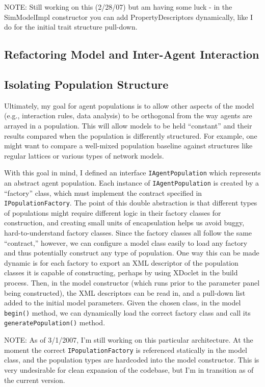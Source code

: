 \documentclass{kluwer-mem-copyright}
\begin{document}
\begin{article}
NOTE:  Still working on this (2/28/07) but am having some luck - in the
SimModelImpl constructor you can add PropertyDescriptors dynamically, like I do
for the initial trait structure pull-down.

\subsection{Refactoring Model and Inter-Agent Interaction}

\subsection{Isolating Population Structure}
Ultimately, my goal for agent populations is to allow other aspects of the model
(e.g., interaction rules, data analysis) to be orthogonal from the way agents
are arrayed in a population.  This will allow models to be held ``constant'' and
their results compared when the population is differently structured.  For
example, one might want to compare a well-mixed population baseline against
structures like regular lattices or various types of network models.  

With this goal in mind, I defined an interface \texttt{IAgentPopulation} which
represents an abstract agent population.  Each instance of
\texttt{IAgentPopulation} is created by a ``factory'' class, which must
implement the contract specified in \texttt{IPopulationFactory}.  The point of
this double abstraction is that different types of populations might require
different logic in their factory classes for construction, and creating small
units of encapsulation helps us avoid buggy, hard-to-understand factory classes.
 Since the factory classes all follow the same ``contract,'' however, we can
 configure a model class easily to load any factory and thus potentially
 construct any type of population.  One way this can be made dynamic is for each
 factory to export an XML descriptor of the population classes it is capable of
 constructing, perhaps by using XDoclet in the build process.  Then, in the
 model constructor (which runs prior to the parameter panel being constructed),
 the XML descriptors can be read in, and a pull-down list added to the initial
 model parameters.  Given the chosen class, in the model \texttt{begin()}
 method, we can dynamically load the correct factory class and call its
 \texttt{generatePopulation()} method.  
 
 NOTE:  As of 3/1/2007, I'm still working on this particular architecture.  At
 the moment the correct \texttt{IPopulationFactory} is referenced statically in
 the model class, and the population types are hardcoded into the model
 constructor.  This is very undesirable for clean expansion of the codebase, but
 I'm in transition as of the current version.  


\end{article}
\end{document}

